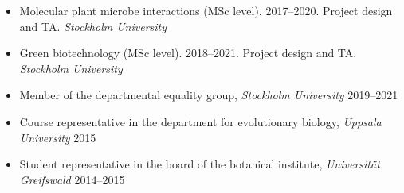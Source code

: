 \documentclass[11pt]{article}
\begin{document}
\vspace{-0.175cm}
\begin{itemize}[label={},itemindent=-9pt,leftmargin=24pt]
	\itemsep-0.1cm
	\item Molecular plant microbe interactions (MSc level). 2017--2020. Project design and TA. \textit{Stockholm University} 	
	\item Green biotechnology (MSc level). 2018--2021. Project design and TA. \textit{Stockholm University} 
\end{itemize}
\vspace{0.3cm}

\vspace{-0.175cm}
\begin{itemize}[label={},itemindent=-9pt,leftmargin=24pt]
	\itemsep-0.1cm
	\item Member of the departmental equality group, \textit{Stockholm University}  \hfill 2019--2021
	\item Course representative in the department for evolutionary biology, \textit{Uppsala University} \hfill 2015
	\item Student representative in the board of the botanical institute, \textit{Universität Greifswald} \hfill 2014--2015
\end{itemize}
\vspace{0.3cm}

\newpage
\end{document}
